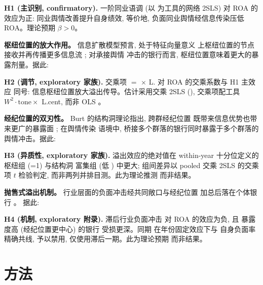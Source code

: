 \textbf{H1 (主识别, confirmatory).} 一阶同业语调
 (以 
为工具的网络 2SLS) 对 ROA 的效应为正: 同业舆情改善提升自身绩效,
等价地, 负面同业舆情经信息传染压低 ROA。理论预期 $\beta>0$。

\textbf{枢纽位置的放大作用。} 信息扩散模型预言, 处于特征向量意义
上枢纽位置的节点接收并再传播更多信息流
\parencite{bonacich1972factoring,yu2024centrality}; 对承接舆情
冲击的银行而言, 枢纽位置意味着更大的暴露剂量。据此:

\textbf{H2 (调节, exploratory 家族).} 交乘项
 $=$  $\times$
L. 对 ROA 的交乘系数与 H1 主效应
同号: 信息枢纽位置放大溢出传导。估计采用交乘 2SLS
(), 交乘项配工具 $W^{2}\cdot\text{tone}\times$
L.cent, 而非 OLS \parencite{brambor2006understanding}。

\textbf{经纪位置的双刃性。} Burt 的结构洞理论指出, 跨群经纪位置
既带来信息优势也带来更广的暴露面
\parencite{burt1992structural,burt2004structural}; 在舆情传染
语境中, 桥接多个群落的银行同时暴露于多个群落的舆情冲击。据此:

\textbf{H3 (异质性, exploratory 家族).} 溢出效应的绝对值在
within-year 十分位定义的枢纽组 (=1) 与结构洞
富集组 (低 ) 中更大; 组间差异以 pooled
交乘 2SLS 的交乘项 $t$ 检验判定, 而非两列并排目测。此为理论推测
而非结果。

\textbf{抛售式溢出机制。} 行业层面的负面冲击经共同敞口与经纪位置
加总后落在个体银行 \parencite{duarte2021firesale,han2024brokerage}。
据此:

\textbf{H4 (机制, exploratory 附录).} 滞后行业负面冲击
 对 ROA 的效应为负, 且
 暴露度高 (经纪位置更中心) 的银行
受损更深。同期  在年份固定效应下与
自身负面率精确共线, 予以禁用, 仅使用滞后一期。此为理论预期
而非结果。

\section{方法}\label{sec:method}
